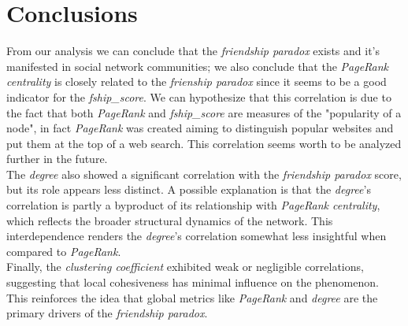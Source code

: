 \documentclass{article}
\begin{document}
\section{Conclusions}
From our analysis we can conclude that the \textit{friendship paradox} exists and it's manifested in social network communities; we also conclude that the \textit{PageRank centrality} is closely related to the \textit{frienship paradox} since it seems to be a good indicator for the \textit{fship\_score}. We can hypothesize that this correlation is due to the fact that both \textit{PageRank} and \textit{fship\_score} are measures of the "popularity of a node", in fact \textit{PageRank} was created aiming to distinguish popular websites and put them at the top of a web search. This correlation seems worth to be analyzed further in the future. \\
The \textit{degree} also showed a significant correlation with the \textit{friendship paradox} score, but its role appears less distinct. 
A possible explanation is that the \textit{degree}'s correlation is partly a byproduct of its relationship with \textit{PageRank centrality}, which reflects the broader structural dynamics of the network. This interdependence renders the \textit{degree}'s correlation somewhat less insightful when compared to \textit{PageRank}. \\
Finally, the \textit{clustering coefficient} exhibited weak or negligible correlations, suggesting that local cohesiveness has minimal influence on the phenomenon. 
This reinforces the idea that global metrics like \textit{PageRank} and \textit{degree} are the primary drivers of the \textit{friendship paradox}.
\end{document}
